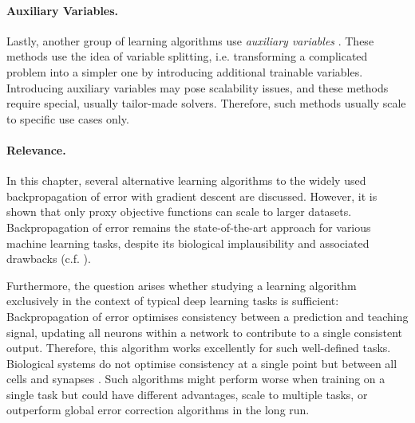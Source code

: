 \paragraph{Auxiliary Variables.} Lastly, another group of learning algorithms use \emph{auxiliary variables} .
These methods use the idea of variable splitting, i.e. transforming a complicated problem into a simpler one by introducing additional trainable variables.
Introducing auxiliary variables may pose scalability issues, and these methods require special, usually tailor-made solvers.
Therefore, such methods usually scale to specific use cases only.

\paragraph{Relevance.} In this chapter, several alternative learning algorithms to the widely used backpropagation of error with gradient descent are discussed. However, it is shown that only proxy objective functions can scale to larger datasets. Backpropagation of error remains the state-of-the-art approach for various machine learning tasks, despite its biological implausibility and associated drawbacks (c.f. ).

Furthermore, the question arises whether studying a learning algorithm exclusively in the context of typical deep learning tasks is sufficient:
Backpropagation of error optimises consistency between a prediction and teaching signal, updating all neurons within a network to contribute to a single consistent output. Therefore, this algorithm works excellently for such well-defined tasks.
Biological systems do not optimise consistency at a single point but between all cells and synapses .
Such algorithms might perform worse when training on a single task but could have different advantages, scale to multiple tasks, or outperform global error correction algorithms in the long run.





